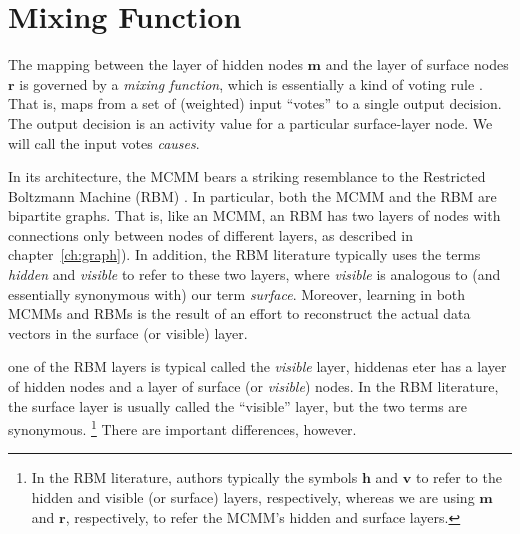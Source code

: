\section{Mixing Function}
\label{sec:mixing-function}

The mapping between the layer of hidden nodes $\mathbf{m}$ 
and the layer of surface nodes $\mathbf{r}$ is governed by a 
\emph{mixing function}, which is essentially
a kind of voting rule \citep{saund:94}. That is, maps from a set of (weighted)
input ``votes'' to a single output decision.  The output decision is 
an activity value for a particular surface-layer node. We will call the input votes
\emph{causes}. 

In its architecture, the \ac{MCMM} bears a striking resemblance to the 
Restricted Boltzmann Machine (RBM) \citep{smolensky:1986}. 
In particular, both the \ac{MCMM} and the \ac{RBM} are bipartite graphs. That is,
like an MCMM, an RBM has two layers of nodes with connections only between nodes of different layers, as described in chapter~\ref{ch:graph}). In addition, the RBM literature typically uses the terms \emph{hidden} and \emph{visible} to refer to these two layers, where \emph{visible} is analogous to (and essentially synonymous with) our term \emph{surface}. Moreover, learning in both MCMMs and RBMs is the result of an effort to reconstruct the actual data vectors in the surface (or visible) layer.

 one of the RBM layers is typical called the \emph{visible} layer,  hiddenas eter has a layer of hidden nodes and a layer of surface (or \emph{visible}) nodes. In the RBM literature, the surface layer is usually called the ``visible'' layer, but the two terms are synonymous. \footnote{In the RBM literature, authors typically the symbols $\textbf{h}$ and $\textbf{v}$ to refer to the hidden and visible (or surface) layers, respectively, whereas we are using $\textbf{m}$ and $\textbf{r}$, respectively, to refer the MCMM's hidden and surface layers.} 
There are important differences, however. 

